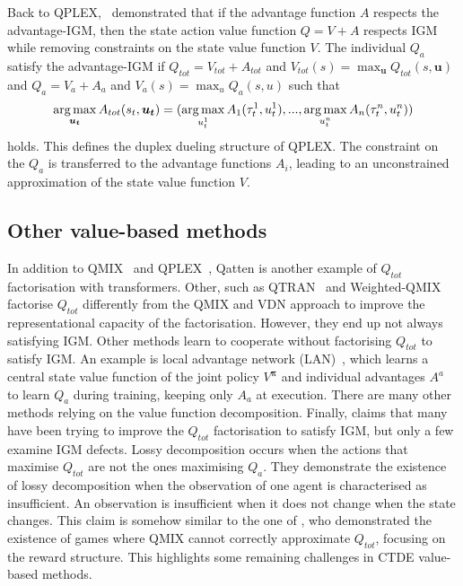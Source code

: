 Back to QPLEX,~\citet{wang2021qplex} demonstrated that if the advantage function $A$ respects the advantage-IGM, then the state action value function $Q = V + A$ respects IGM while removing constraints on the state value function $V$.
The individual $Q_a$ satisfy the advantage-IGM if $Q_{tot}=V_{tot}+A_{tot}$ and $V_{tot}(s)=\max_{\mathbf{u}} Q_{tot}(s, \mathbf{u})$ and $Q_a=V_a+A_a$ and $V_a(s)=\max_{u} Q_a(s, u)$ such that 
\begin{equation}
    \argmax_{\mathbf{u_t}} A_{tot}(s_t, \mathbf{u_t}) =(\argmax_{u_t^{1}} A_{1}(\tau_t^{1}, u_t^{1}),...,\argmax_{u_t^{n}} A_{n}(\tau_t^{n}, u_t^{n}))    
\label{eq:ch3_adv_igm}
\end{equation}
holds.
This defines the duplex dueling structure of QPLEX.
The constraint on the $Q_a$ is transferred to the advantage functions $A_i$, leading to an unconstrained approximation of the state value function $V$.

\subsection{Other value-based methods}
In addition to QMIX~\citep{Rashid2018} and QPLEX~\citep{wang2021qplex}, Qatten \citep{yang2020qatten} is another example of $Q_{tot}$ factorisation with transformers.
Other, such as QTRAN~\citep{Son2019QTRAN:Learning} and Weighted-QMIX~\citep{rashid2020weighted} factorise $Q_{tot}$ differently from the QMIX and VDN approach to improve the representational capacity of the factorisation.
However, they end up not always satisfying IGM.
Other methods learn to cooperate without factorising $Q_{tot}$ to satisfy IGM.
An example is local advantage network (LAN)~\citep{avalos2023local}, which learns a central state value function of the joint policy $V^{\mathbf{\pi}}$ and individual advantages $A^a$ to learn $Q_a$ during training, keeping only $A_a$ at execution.
There are many other methods relying on the value function decomposition.
Finally, \cite{hong_rethinkigm} claims that many have been trying to improve the $Q_{tot}$ factorisation to satisfy IGM, but only a few examine IGM defects.
Lossy decomposition occurs when the actions that maximise $Q_{tot}$ are not the ones maximising $Q_a$.
They demonstrate the existence of lossy decomposition when the observation of one agent is characterised as insufficient.
An observation is insufficient when it does not change when the state changes. 
This claim is somehow similar to the one of \cite{Mahajan2019MAVEN:Exploration}, who demonstrated the existence of games where QMIX cannot correctly approximate  $Q_{tot}$, focusing on the reward structure.
This highlights some remaining challenges in CTDE value-based methods.

